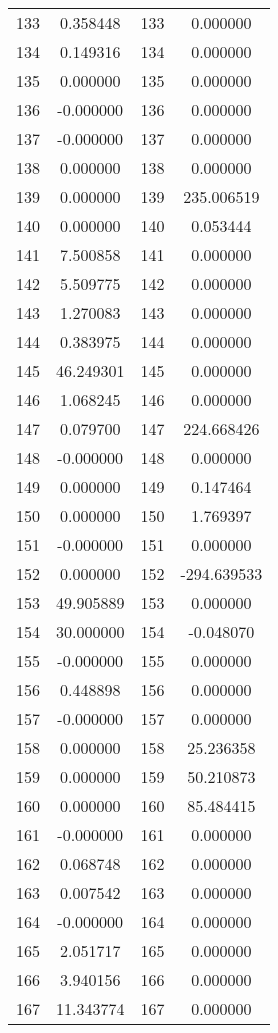 \documentclass[12pt]{article}
\begin{document}
\begin{longtable}{@{}cccc@{}}
133 & 0.358448 & 133 & 0.000000 \\
134 & 0.149316 & 134 & 0.000000 \\
135 & 0.000000 & 135 & 0.000000 \\
136 & -0.000000 & 136 & 0.000000 \\
137 & -0.000000 & 137 & 0.000000 \\
138 & 0.000000 & 138 & 0.000000 \\
139 & 0.000000 & 139 & 235.006519 \\
140 & 0.000000 & 140 & 0.053444 \\
141 & 7.500858 & 141 & 0.000000 \\
142 & 5.509775 & 142 & 0.000000 \\
143 & 1.270083 & 143 & 0.000000 \\
144 & 0.383975 & 144 & 0.000000 \\
145 & 46.249301 & 145 & 0.000000 \\
146 & 1.068245 & 146 & 0.000000 \\
147 & 0.079700 & 147 & 224.668426 \\
148 & -0.000000 & 148 & 0.000000 \\
149 & 0.000000 & 149 & 0.147464 \\
150 & 0.000000 & 150 & 1.769397 \\
151 & -0.000000 & 151 & 0.000000 \\
152 & 0.000000 & 152 & -294.639533 \\
153 & 49.905889 & 153 & 0.000000 \\
154 & 30.000000 & 154 & -0.048070 \\
155 & -0.000000 & 155 & 0.000000 \\
156 & 0.448898 & 156 & 0.000000 \\
157 & -0.000000 & 157 & 0.000000 \\
158 & 0.000000 & 158 & 25.236358 \\
159 & 0.000000 & 159 & 50.210873 \\
160 & 0.000000 & 160 & 85.484415 \\
161 & -0.000000 & 161 & 0.000000 \\
162 & 0.068748 & 162 & 0.000000 \\
163 & 0.007542 & 163 & 0.000000 \\
164 & -0.000000 & 164 & 0.000000 \\
165 & 2.051717 & 165 & 0.000000 \\
166 & 3.940156 & 166 & 0.000000 \\
167 & 11.343774 & 167 & 0.000000 \\

\end{longtable}
\end{document}
